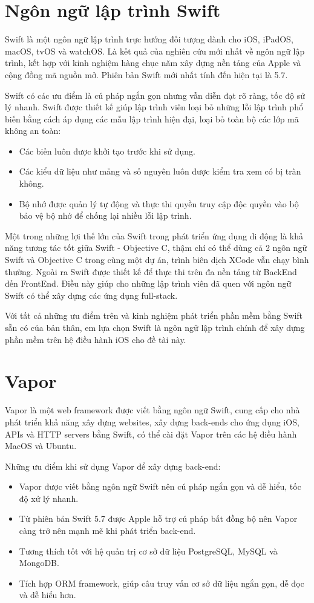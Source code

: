 \documentclass[../DoAn.tex]{subfiles}
\begin{document}
\section{Ngôn ngữ lập trình Swift}
Swift là một ngôn ngữ lập trình trực hướng đối tượng dành cho iOS, iPadOS, macOS, tvOS và watchOS. Là kết quả của nghiên cứu mới nhất về ngôn ngữ lập trình, kết hợp với kinh nghiệm hàng chục năm xây dựng nền tảng của Apple và cộng đồng mã nguồn mở. Phiên bản Swift mới nhất tính đến hiện tại là 5.7\cite{Swift}. 

Swift có các ưu điểm là cú pháp ngắn gọn nhưng vẫn diễn đạt rõ ràng, tốc độ sử lý nhanh. Swift được thiết kế giúp lập trình viên  loại bỏ những lỗi lập trình phổ biến bằng cách áp dụng các mẫu lập trình hiện đại, loại bỏ toàn bộ các lớp mã không an toàn:
\begin{itemize}
    \item Các biến luôn được khởi tạo trước khi sử dụng.
    \item Các kiểu dữ liệu như mảng và số nguyên luôn được kiểm tra xem có bị tràn không.
    \item Bộ nhớ được quản lý tự động và thực thi quyền truy cập độc quyền vào bộ bảo vệ bộ nhớ để chống lại nhiều lỗi lập trình.
\end{itemize}

Một trong những lợi thế lớn của Swift trong phát triển ứng dụng di động là khả năng tương tác tốt giữa Swift - Objective C, thậm chí có thể dùng cả 2 ngôn ngữ Swift và Objective C trong cùng một dự án, trình biên dịch XCode vẫn chạy bình thường. Ngoài ra Swift được thiết kế để thực thi trên đa nền tảng từ BackEnd đến FrontEnd. Điều này giúp cho những lập trình viên đã quen với ngôn ngữ Swift có thể xây dựng các ứng dụng full-stack.

Với tất cả những ưu điểm trên và kinh nghiệm phát triển phần mềm bằng Swift sẵn có của bản thân, em lựa chọn Swift là ngôn ngữ lập trình chính để xây dựng phần mềm trên hệ điều hành iOS cho đề tài này.


\section{Vapor}
Vapor là một web framework được viết bằng ngôn ngữ Swift, cung cấp cho nhà phát triển khả năng xây dựng websites, xây dựng back-ends cho ứng dụng iOS, APIs và HTTP servers bằng Swift, có thể cài đặt Vapor trên các hệ điều hành MacOS và Ubuntu\cite{Vapor}. 

Những ưu điểm khi sử dụng Vapor để xây dựng back-end:
\begin{itemize}
    \item Vapor được viết bằng ngôn ngữ Swift nên cú pháp ngắn gọn và dễ hiểu, tốc độ xử lý nhanh.
    \item Từ phiên bản Swift 5.7 được Apple hỗ trợ cú pháp bất đồng bộ nên Vapor càng trở nên mạnh mẽ khi phát triển back-end.
    \item Tương thích tốt với hệ quản trị cơ sở dữ liệu PostgreSQL, MySQL và MongoDB.
    \item Tích hợp ORM framework, giúp câu truy vấn cơ sở dữ liệu ngắn gọn, dễ đọc và dễ hiểu hơn.
\end{itemize}
\end{document}

